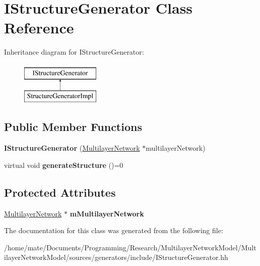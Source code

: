 \hypertarget{classIStructureGenerator}{}\section{I\+Structure\+Generator Class Reference}
\label{classIStructureGenerator}
Inheritance diagram for I\+Structure\+Generator\+:\begin{figure}[H]
\begin{center}
\leavevmode
\includegraphics[height=2.000000cm]{classIStructureGenerator}
\end{center}
\end{figure}
\subsection*{Public Member Functions}
\begin{DoxyCompactItemize}
\item 
{\bfseries I\+Structure\+Generator} (\hyperlink{classMultilayerNetwork}{Multilayer\+Network} $\ast$multilayer\+Network)\hypertarget{classIStructureGenerator_af1536f217b3898a794a23417b3a0a2ed}{}\label{classIStructureGenerator_af1536f217b3898a794a23417b3a0a2ed}

\item 
virtual void {\bfseries generate\+Structure} ()=0\hypertarget{classIStructureGenerator_a6fd7b5ad3b544e5069e83a5fc62e249c}{}\label{classIStructureGenerator_a6fd7b5ad3b544e5069e83a5fc62e249c}

\end{DoxyCompactItemize}
\subsection*{Protected Attributes}
\begin{DoxyCompactItemize}
\item 
\hyperlink{classMultilayerNetwork}{Multilayer\+Network} $\ast$ {\bfseries m\+Multilayer\+Network}\hypertarget{classIStructureGenerator_af3bd39449b5256b4e4505005c34f33c4}{}\label{classIStructureGenerator_af3bd39449b5256b4e4505005c34f33c4}

\end{DoxyCompactItemize}


The documentation for this class was generated from the following file\+:\begin{DoxyCompactItemize}
\item 
/home/mate/\+Documents/\+Programming/\+Research/\+Multilayer\+Network\+Model/\+Multilayer\+Network\+Model/sources/generators/include/I\+Structure\+Generator.\+hh\end{DoxyCompactItemize}
